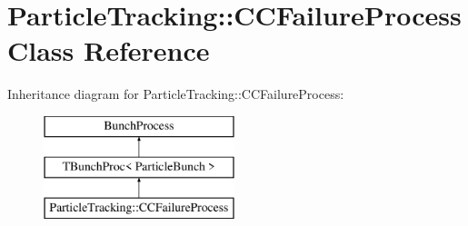\hypertarget{classParticleTracking_1_1CCFailureProcess}{}\section{Particle\+Tracking\+:\+:C\+C\+Failure\+Process Class Reference}
\label{classParticleTracking_1_1CCFailureProcess}
Inheritance diagram for Particle\+Tracking\+:\+:C\+C\+Failure\+Process\+:\begin{figure}[H]
\begin{center}
\leavevmode
\includegraphics[height=3.000000cm]{classParticleTracking_1_1CCFailureProcess}
\end{center}
\end{figure}
